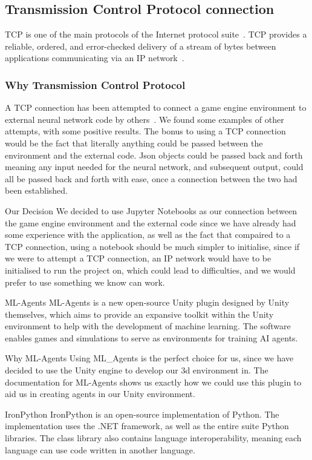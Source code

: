 \subsection{Transmission Control Protocol connection}
TCP is one of the main protocols of the Internet protocol suite~\cite{TCP}. 
TCP provides a reliable, ordered, and error-checked delivery of a stream of bytes between applications communicating via an IP network~\cite{TCPsdx}. 

\subsubsection{Why Transmission Control Protocol}
A TCP connection has been attempted to connect a game engine environment to external neural network code by others~\cite{UnityTCP}. We found some examples of other attempts, with some positive results. The bonus to using a TCP connection would be the fact that literally anything could be passed between the environment and the external code. Json objects could be passed back and forth meaning any input needed for the neural network, and subsequent output, could all be passed back and forth with ease, once a connection between the two had been established.

Our Decision
We decided to use Jupyter Notebooks as our connection between the game engine environment and the external code since we have already had some experience with the application, as well as the fact that compaired to a TCP connection, using a notebook should be much simpler to initialise, since if we were to attempt a TCP connection, an IP network would have to be initialised to run the project on, which could lead to difficulties, and we would prefer to use something we know can work.

ML-Agents
ML-Agents is a new open-source Unity plugin designed by Unity themselves, which aims to provide an expansive toolkit within the Unity environment to help with the development of machine learning. The software enables games and simulations to serve as environments for training AI agents. 

Why ML-Agents
Using ML_Agents is the perfect choice for us, since we have decided to use the Unity engine to develop our 3d environment in. The documentation for ML-Agents shows us exactly how we could use this plugin to aid us in creating agents in our Unity environment.






IronPython
IronPython is an open-source implementation of Python. The implementation uses the .NET framework, as well as the entire suite Python libraries. The class library also contains language interoperability, meaning each language can use code written in another language.

